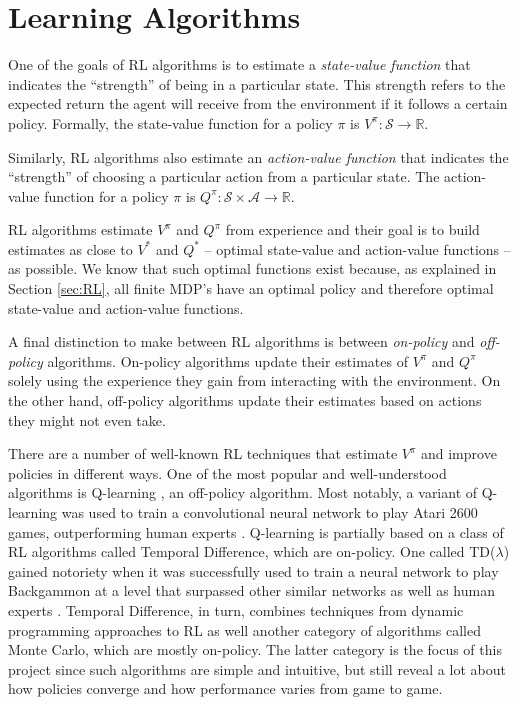 \documentclass[11pt,a4paper,twoside,openright]{report}
\begin{document}
\section{Learning Algorithms}
\label{sec:learning-algorithms}

One of the goals of RL algorithms is to estimate a \emph{state-value function} that indicates the ``strength'' of being in a particular state. This strength refers to the expected return the agent will receive from the environment if it follows a certain policy. Formally, the state-value function for a policy $\pi$ is $V^{\pi} : \mathcal{S} \rightarrow \mathbb{R}$.

Similarly, RL algorithms also estimate an \emph{action-value function} that indicates the ``strength'' of choosing a particular action from a particular state. The action-value function for a policy $\pi$ is $Q^{\pi} : \mathcal{S} \times \mathcal{A} \rightarrow \mathbb{R}$.

RL algorithms estimate $V^{\pi}$ and $Q^{\pi}$ from experience and their goal is to build estimates as close to $V^{\ast}$ and $Q^{\ast}$ -- optimal state-value and action-value functions -- as possible. We know that such optimal functions exist because, as explained in Section \ref{sec:RL}, all finite MDP's have an optimal policy and therefore optimal state-value and action-value functions.

A final distinction to make between RL algorithms is between \emph{on-policy} and \emph{off-policy} algorithms. On-policy algorithms update their estimates of  $V^{\pi}$ and  $Q^{\pi}$ solely using the experience they gain from interacting with the environment. On the other hand, off-policy algorithms update their estimates based on actions they might not even take.

There are a number of well-known RL techniques that estimate $V^{\pi}$ and improve policies in different ways. One of the most popular and well-understood \cite{challenges-of-rl} algorithms is Q-learning \cite{q-learning}, an off-policy algorithm. Most notably, a variant of Q-learning was used to train a convolutional neural network to play Atari 2600 games, outperforming human experts \cite{atari}. Q-learning is partially based on a class of RL algorithms called Temporal Difference, which are on-policy. One called TD($\lambda$) gained notoriety when it was successfully used to train a neural network to play Backgammon at a level that surpassed other similar networks as well as human experts \cite{backgammon}. Temporal Difference, in turn, combines techniques from dynamic programming approaches to RL as well another category of algorithms called Monte Carlo, which are mostly on-policy. The latter category is the focus of this project since such algorithms are simple and intuitive, but still reveal a lot about how policies converge and how performance varies from game to game.
\end{document}
